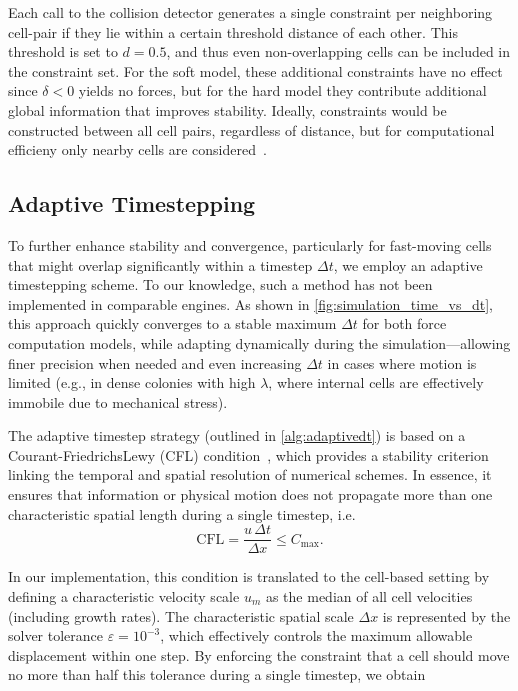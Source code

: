 \documentclass[conference]{IEEEtran}
\begin{document}
Each call to the collision detector generates a single constraint per neighboring cell-pair if they lie within a certain threshold distance of each other. This threshold is set to $d=0.5$, and thus even non-overlapping cells can be included in the constraint set. For the soft model, these additional constraints have no effect since $\delta < 0$ yields no forces, but for the hard model they contribute additional global information that improves stability. Ideally, constraints would be constructed between all cell pairs, regardless of distance, but for computational efficieny only nearby cells are considered~\cite{Yan2019, Yan2022}.


\subsection{Adaptive Timestepping}

To further enhance stability and convergence, particularly for fast-moving cells that might overlap significantly within a timestep $\Delta t$, we employ an adaptive timestepping scheme. To our knowledge, such a method has not been implemented in comparable engines. As shown in \autoref{fig:simulation_time_vs_dt}, this approach quickly converges to a stable maximum $\Delta t$ for both force computation models, while adapting dynamically during the simulation—allowing finer precision when needed and even increasing $\Delta t$ in cases where motion is limited (e.g., in dense colonies with high $\lambda$, where internal cells are effectively immobile due to mechanical stress).


The adaptive timestep strategy (outlined in \autoref{alg:adaptivedt}) is based on a Courant-FriedrichsLewy (CFL) condition~\cite{Courant1928}, which provides a stability criterion linking the temporal and spatial resolution of numerical schemes. In essence, it ensures that information or physical motion does not propagate more than one characteristic spatial length during a single timestep, i.e.
\begin{equation}
    \text{CFL} = \frac{u \, \Delta t}{\Delta x} \leq C_{\text{max}}.
\end{equation}

In our implementation, this condition is translated to the cell-based setting by defining a characteristic velocity scale $u_m$ as the median of all cell velocities (including growth rates).
The characteristic spatial scale $\Delta x$ is represented by the solver tolerance $\varepsilon = 10^{-3}$, which effectively controls the maximum allowable displacement within one step.
By enforcing the constraint that a cell should move no more than half this tolerance during a single timestep, we obtain
\end{document}

